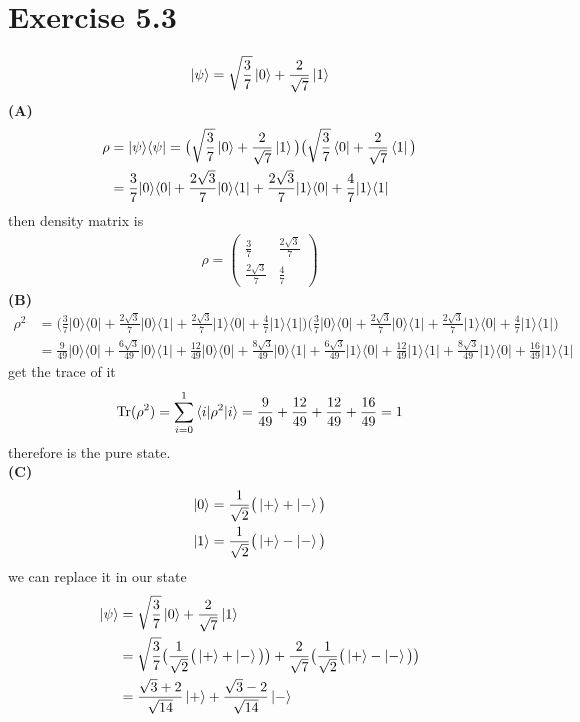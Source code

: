 \documentclass{article}
\newcommand{\op}[2]{|#1\rangle \langle#2|}
\newcommand{\sand}[3]{\braket{#1 | #2 | #3}}
\begin{document}
\section*{Exercise 5.3}
\begin{align*}
    \ket{\psi} = \sqrt{\frac{3}{7}}\ket{0} + \frac{2}{\sqrt{7}}\ket{1}
\end{align*}
\textbf{(A)}
\begin{align*}
    \rho &= \op{\psi}{\psi} = \big(\sqrt{\frac{3}{7}}\ket{0} + \frac{2}{\sqrt{7}}\ket{1}\big)\big(\sqrt{\frac{3}{7}}\bra{0} + \frac{2}{\sqrt{7}}\bra{1}\big) \\
    &= \frac{3}{7}\op{0}{0} + \frac{2\sqrt{3}}{7}\op{0}{1} + \frac{2\sqrt{3}}{7}\op{1}{0} + \frac{4}{7}\op{1}{1}
\end{align*}
then density matrix is
\begin{align*}
    \rho = 
    \begin{pmatrix}
        \displaystyle\frac{3}{7} & \displaystyle\frac{2\sqrt{3}}{7} \\[1em]
        \displaystyle\frac{2\sqrt{3}}{7} & \displaystyle\frac{4}{7}
    \end{pmatrix}
\end{align*}
\textbf{(B)}
\begin{align*}
    \rho^2 &= \big(\frac{3}{7}\op{0}{0} + \frac{2\sqrt{3}}{7}\op{0}{1} + \frac{2\sqrt{3}}{7}\op{1}{0} + \frac{4}{7}\op{1}{1}\big)\big(\frac{3}{7}\op{0}{0} + \frac{2\sqrt{3}}{7}\op{0}{1} + \frac{2\sqrt{3}}{7}\op{1}{0} + \frac{4}{7}\op{1}{1}\big) \\
    &= \frac{9}{49}\op{0}{0} + \frac{6\sqrt{3}}{49}\op{0}{1} + \frac{12}{49}\op{0}{0} + \frac{8\sqrt{3}}{49}\op{0}{1} + \frac{6\sqrt{3}}{49}\op{1}{0} + \frac{12}{49}\op{1}{1} + \frac{8\sqrt{3}}{49}\op{1}{0} + \frac{16}{49}\op{1}{1}
\end{align*}
 get the trace of it
\begin{align*}
    \text{Tr}(\rho^2) =  \sum_{i=0}^{1} \sand{i}{\rho^2}{i} = \frac{9}{49} + \frac{12}{49} + \frac{12}{49} + \frac{16}{49} = 1
\end{align*}
therefore is the pure state. \\
\textbf{(C)}
\begin{align*}
    \ket{0} &= \frac{1}{\sqrt{2}}\big(\ket{+} + \ket{-}\big) \\
    \ket{1} &= \frac{1}{\sqrt{2}}\big(\ket{+} - \ket{-}\big)
\end{align*}
we can replace it in our state
\begin{align*}
    \ket{\psi} &= \sqrt{\frac{3}{7}}\ket{0} + \frac{2}{\sqrt{7}}\ket{1} \\
    &= \sqrt{\frac{3}{7}}\big(\frac{1}{\sqrt{2}}\big(\ket{+} + \ket{-}\big)\big)
    + \frac{2}{\sqrt{7}}\big(\frac{1}{\sqrt{2}}\big(\ket{+} - \ket{-}\big)\big) \\
    &= \frac{\sqrt{3}+2}{\sqrt{14}}\ket{+} + \frac{\sqrt{3}-2}{\sqrt{14}}\ket{-}
\end{align*}
\end{document}
